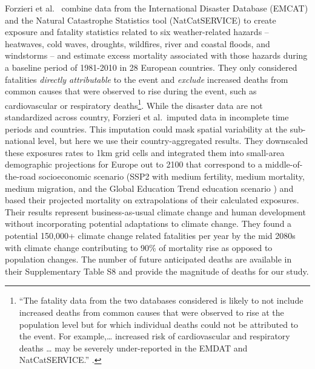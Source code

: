 \documentclass[12pt]{article}
\begin{document}
Forzieri et al.~\citeyearpar{forzieri2017increasing} combine data from
the International Disaster Database (EMCAT) and the Natural Catastrophe
Statistics tool (NatCatSERVICE) to create exposure and fatality
statistics related to six weather-related hazards -- heatwaves, cold
waves, droughts, wildfires, river and coastal floods, and windstorms --
and estimate excess mortality associated with those hazards during a
baseline period of 1981-2010 in 28 European countries. They only
considered fatalities \emph{directly attributable} to the event and
\emph{exclude} increased deaths from common causes that were observed to
rise during the event, such as cardiovascular or respiratory
deaths\footnote{``The fatality data from the two databases considered is
  likely to not include increased deaths from common causes that were
  observed to rise at the population level but for which individual
  deaths could not be attributed to the event. For example,\ldots{}
  increased risk of cardiovascular and respiratory deaths \ldots{} may
  be severely under-reported in the EMDAT and NatCatSERVICE.''
  \citep[see][pp.~9, \emph{Supplementary
  Materials}]{forzieri2017increasing}.}. While the disaster data are not
standardized across country, Forzieri et al.~imputed data in incomplete
time periods and countries. This imputation could mask spatial
variability at the sub-national level, but here we use their
country-aggregated results. They downscaled these exposures rates to 1km
grid cells and integrated them into small-area demographic projections
for Europe out to 2100 that correspond to a middle-of-the-road
socioeconomic scenario (SSP2 with medium fertility, medium mortality,
medium migration, and the Global Education Trend education scenario
\citep{jiang2014internal, samir2017human, o2017roads}) and based their
projected mortality on extrapolations of their calculated exposures.
Their results represent business-as-usual climate change and human
development without incorporating potential adaptations to climate
change. They found a potential 150,000+ climate change related
fatalities per year by the mid 2080s with climate change contributing to
90\% of mortality rise as opposed to population changes. The number of
future anticipated deaths are available in their Supplementary Table S8
\citep{forzieri2017increasing} and provide the magnitude of deaths for
our study.
\end{document}
